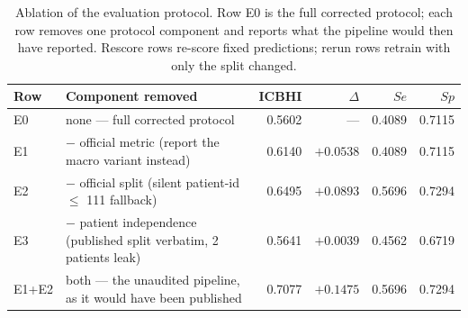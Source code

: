 \begin{table}[!t]
\centering
\caption{Ablation of the evaluation protocol. Row E0 is the full corrected protocol; each row removes one protocol component and reports what the pipeline would then have reported. Rescore rows re-score fixed predictions; rerun rows retrain with only the split changed.}
\label{tab:protocolablation}
\begin{tabular}{llrrrr}
\toprule
Row & Component removed & ICBHI & $\Delta$ & $Se$ & $Sp$ \\
\midrule
E0 & none — full corrected protocol & 0.5602 & --- & 0.4089 & 0.7115 \\
E1 & $-$ official metric (report the macro variant instead) & 0.6140 & $+0.0538$ & 0.4089 & 0.7115 \\
E2 & $-$ official split (silent patient-id $\leq$ 111 fallback) & 0.6495 & $+0.0893$ & 0.5696 & 0.7294 \\
E3 & $-$ patient independence (published split verbatim, 2 patients leak) & 0.5641 & $+0.0039$ & 0.4562 & 0.6719 \\
E1+E2 & both — the unaudited pipeline, as it would have been published & 0.7077 & $+0.1475$ & 0.5696 & 0.7294 \\
\bottomrule
\end{tabular}
\end{table}
